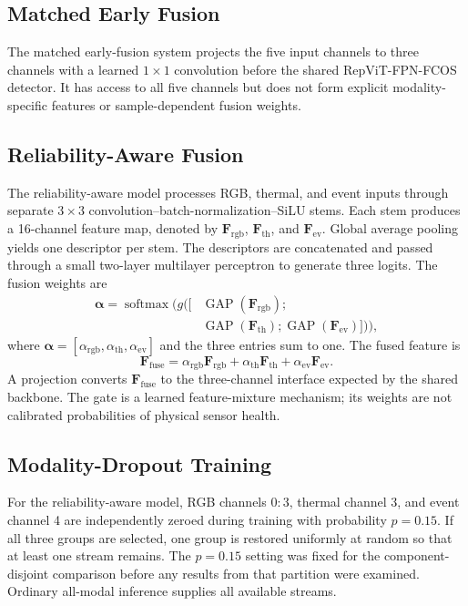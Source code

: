 \documentclass[pdflatex,sn-basic,Numbered,iicol]{sn-jnl}
\begin{document}
\subsection{Matched Early Fusion}
The matched early-fusion system projects the five input channels to three channels with a learned $1\times1$ convolution before the shared RepViT-FPN-FCOS detector. It has access to all five channels but does not form explicit modality-specific features or sample-dependent fusion weights.

\subsection{Reliability-Aware Fusion}
The reliability-aware model processes RGB, thermal, and event inputs through separate $3\times3$ convolution--batch-normalization--SiLU stems. Each stem produces a 16-channel feature map, denoted by $\mathbf{F}_{\mathrm{rgb}}$, $\mathbf{F}_{\mathrm{th}}$, and $\mathbf{F}_{\mathrm{ev}}$. Global average pooling yields one descriptor per stem. The descriptors are concatenated and passed through a small two-layer multilayer perceptron to generate three logits. The fusion weights are
\begin{equation}
\begin{aligned}
\boldsymbol{\alpha}=\operatorname{softmax}\bigl(g([&\operatorname{GAP}(\mathbf{F}_{\mathrm{rgb}});\\
&\operatorname{GAP}(\mathbf{F}_{\mathrm{th}});\operatorname{GAP}(\mathbf{F}_{\mathrm{ev}})])\bigr),
\end{aligned}
\end{equation}
where $\boldsymbol{\alpha}=[\alpha_{\mathrm{rgb}},\alpha_{\mathrm{th}},\alpha_{\mathrm{ev}}]$ and the three entries sum to one. The fused feature is
\begin{equation}
\mathbf{F}_{\mathrm{fuse}}=\alpha_{\mathrm{rgb}}\mathbf{F}_{\mathrm{rgb}}+\alpha_{\mathrm{th}}\mathbf{F}_{\mathrm{th}}+\alpha_{\mathrm{ev}}\mathbf{F}_{\mathrm{ev}}.
\end{equation}
A projection converts $\mathbf{F}_{\mathrm{fuse}}$ to the three-channel interface expected by the shared backbone. The gate is a learned feature-mixture mechanism; its weights are not calibrated probabilities of physical sensor health.

\subsection{Modality-Dropout Training}
For the reliability-aware model, RGB channels $0{:}3$, thermal channel 3, and event channel 4 are independently zeroed during training with probability $p=0.15$. If all three groups are selected, one group is restored uniformly at random so that at least one stream remains. The $p=0.15$ setting was fixed for the component-disjoint comparison before any results from that partition were examined. Ordinary all-modal inference supplies all available streams.
\end{document}
